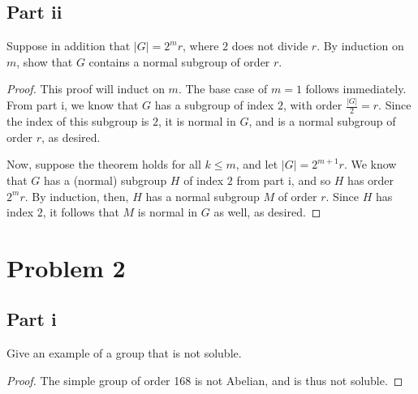 \documentclass[12pt,reqno]{amsart}
\begin{document}
\subsection*{Part ii}
Suppose in addition that $|G| = 2^mr$, where $2$ does not divide $r$. By
induction on $m$, show that $G$ contains a normal subgroup of order $r$.
\\
\begin{proof}
    This proof will induct on $m$. The base case of $m=1$ follows immediately.
    From part i, we know that $G$ has a subgroup of index $2$, with
    order $\frac{|G|}{2} = r$. Since the index of this subgroup is $2$, it is
    normal in $G$, and is a normal subgroup of order $r$, as desired. 

    Now, suppose the theorem holds for all $k\leq m$, and let $|G| = 2^{m+1}r$. 
    We know that $G$ has a (normal) subgroup $H$ of index $2$ from part i, and
    so $H$ has order $2^mr$. By induction, then, $H$ has a normal subgroup $M$ of order
    $r$. Since $H$ has index $2$, it follows that $M$ is normal in $G$ as well,
    as desired.
\end{proof}

\newpage

\section*{Problem 2}
\subsection*{Part i}
Give an example of a group that is not soluble.
\\
\begin{proof}
    The simple group of order 168 is not Abelian, and is thus not soluble.
\end{proof}
\end{document}
